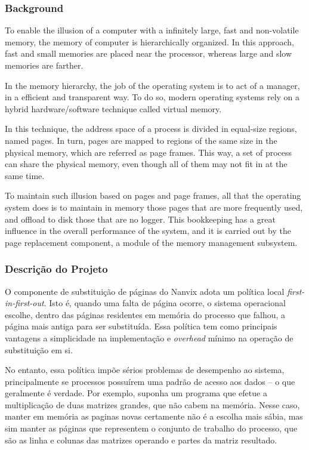 \documentclass[11pt]{article}
\begin{document}
	\subsubsection*{Background}

		To enable the illusion of a computer with a infinitely large,
		fast and non-volatile memory, the memory of computer is
		hierarchically organized. In this approach, fast and small memories
		are placed near the processor, whereas large and slow memories
		are farther.

		In the memory hierarchy, the job of the operating system is to
		act of a manager, in a efficient and transparent way. To do so,
		modern operating systems rely on a hybrid hardware/software
		technique called virtual memory.

		In this technique, the address space of a process is divided in
		equal-size regions, named pages. In turn, pages are mapped to
		regions of the same size in the physical memory, which are
		referred as page frames. This way, a set of process can share
		the physical memory, even though all of them may not fit in at
		the same time.

		To maintain such illusion based on pages and page frames, all
		that the operating system does is to maintain in memory those
		pages that are more frequently used, and offload to disk those
		that are no logger. This bookkeeping has a great influence in
		the overall performance of the system, and it is carried out by
		the page replacement component, a module of the memory
		management subsystem.
\fi\fi
\subsubsection*{Descrição do Projeto}

O componente de substituição de páginas do Nanvix adota um política local \textit{first-in-first-out}. Isto é, quando uma falta de página ocorre, o sistema operacional escolhe, dentro das páginas residentes em memória do processo que falhou, a página mais antiga para ser substituída. Essa política tem como principais vantagens a simplicidade na implementação e \textit{overhead} mínimo na operação de substituição em si.

No entanto, essa política impõe sérios problemas de desempenho ao sistema, principalmente se processos possuírem uma padrão de acesso aos dados -- o que geralmente é verdade. Por exemplo, suponha um programa que efetue a multiplicação de duas matrizes grandes, que não cabem na memória. Nesse caso, manter em memória as paginas novas certamente não é a escolha mais sábia, mas sim manter as páginas que representem o conjunto de trabalho do processo, que são as linha e colunas das matrizes operando e partes da matriz resultado.
\end{document}
